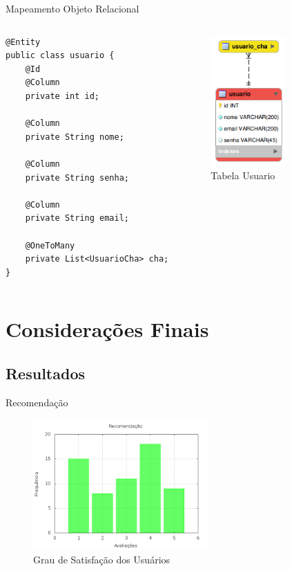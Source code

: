 \documentclass[xcolor=dvipsnames]{beamer}
\begin{document}
\begin{frame}[fragile]{Mapeamento Objeto Relacional}
	\begin{columns}[c]
			\begin{lstlisting}[style=Java]
@Entity
public class usuario {
	@Id
	@Column
	private int id;

	@Column
	private String nome;

	@Column
	private String senha;
		
	@Column
	private String email;		
	
	@OneToMany
	private List<UsuarioCha> cha;
}
			\end{lstlisting}							
			\begin{figure}[!htb]
				\centering
				\includegraphics[keepaspectratio=true,height=5cm]{usuario-ER.png}
				\caption{Tabela Usuario}
				\label{usuario-ER}
			\end{figure}	
	\end{columns}
\end{frame}


\section{Considerações Finais}
	\subsection{Resultados}
		\begin{frame}[fragile]{Recomendação}
			\begin{figure}[!htb]
				\centering
				\includegraphics[keepaspectratio=true,height=5cm]{avalia.png}
				\caption{Grau de Satisfação dos Usuários}
				\label{avalia}
			\end{figure}		
			
			

		\end{frame}
\end{document}
